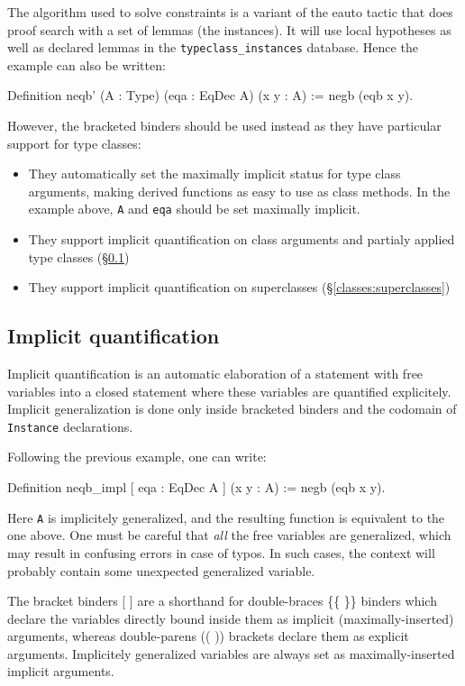 The algorithm used to solve constraints is a variant of the eauto tactic
that does proof search with a set of lemmas (the instances). It will use
local hypotheses as well as declared lemmas in the
\texttt{typeclass\_instances} database. Hence the example can also be
written:

\begin{coq_example}
  Definition neqb' (A : Type) (eqa : EqDec A) (x y : A) := negb (eqb x y).
\end{coq_example}

However, the bracketed binders should be used instead as they have
particular support for type classes:
\begin{itemize}
\item They automatically set the maximally implicit status for type
  class arguments, making derived functions as easy to use as class
  methods. In the example above, \texttt{A} and \texttt{eqa} should be
  set maximally implicit.
\item They support implicit quantification on class arguments and
  partialy applied type classes (\S \ref{classes:impl-quant})
\item They support implicit quantification on superclasses (\S \ref{classes:superclasses})
\end{itemize}

\subsection{Implicit quantification}
\label{classes:impl-quant}

Implicit quantification is an automatic elaboration of a statement with
free variables into a closed statement where these variables are
quantified explicitely. Implicit generalization is done only inside
bracketed binders and the codomain of \texttt{Instance} declarations.

Following the previous example, one can write:
\begin{coq_example}
  Definition neqb_impl [ eqa : EqDec A ] (x y : A) := negb (eqb x y).
\end{coq_example}

Here \texttt{A} is implicitely generalized, and the resulting function
is equivalent to the one above. One must be careful that \emph{all} the
free variables are generalized, which may result in confusing errors in
case of typos. In such cases, the context will probably contain some
unexpected generalized variable.

The bracket binders [ ] are a shorthand for double-braces \{\{ \}\} binders
which declare the variables directly bound inside them as implicit
(maximally-inserted) arguments, whereas double-parens (( )) brackets
declare them as explicit arguments. Implicitely generalized variables
are always set as maximally-inserted implicit arguments.

